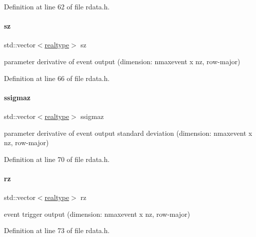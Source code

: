 Definition at line 62 of file rdata.\+h.

\mbox{\label{classamici_1_1_return_data_a6588db55743b7fdebe807b52387d6b37}} 
\paragraph{\texorpdfstring{sz}{sz}}
{\footnotesize\ttfamily std\+::vector$<$\mbox{\hyperlink{namespaceamici_a1bdce28051d6a53868f7ccbf5f2c14a3}{realtype}}$>$ sz}

parameter derivative of event output (dimension\+: nmaxevent x nz, row-\/major) 

Definition at line 66 of file rdata.\+h.

\mbox{\label{classamici_1_1_return_data_a23c0635afe68ab5c73095fa1e4d61055}} 
\paragraph{\texorpdfstring{ssigmaz}{ssigmaz}}
{\footnotesize\ttfamily std\+::vector$<$\mbox{\hyperlink{namespaceamici_a1bdce28051d6a53868f7ccbf5f2c14a3}{realtype}}$>$ ssigmaz}

parameter derivative of event output standard deviation (dimension\+: nmaxevent x nz, row-\/major) 

Definition at line 70 of file rdata.\+h.

\mbox{\label{classamici_1_1_return_data_a1f65c4ec9c07d353d79f54d4c96365ca}} 
\paragraph{\texorpdfstring{rz}{rz}}
{\footnotesize\ttfamily std\+::vector$<$\mbox{\hyperlink{namespaceamici_a1bdce28051d6a53868f7ccbf5f2c14a3}{realtype}}$>$ rz}

event trigger output (dimension\+: nmaxevent x nz, row-\/major) 

Definition at line 73 of file rdata.\+h.

